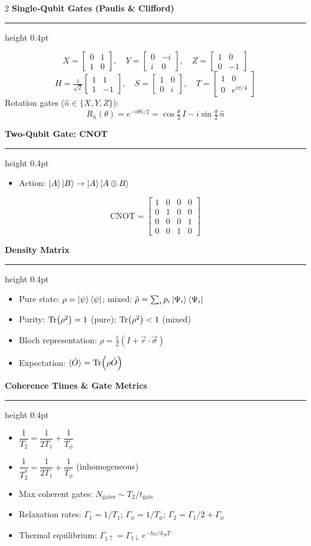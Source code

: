 \documentclass[10pt,a4paper]{article}
\newcommand{\subsec}[1]{%
  \vspace{3pt}%
  {\small\bfseries\color{subseccolor}#1}%
  \vspace{1pt}\hrule height 0.4pt \vspace{2pt}%
}
\begin{document}
\begin{multicols}{2}
\subsec{Single-Qubit Gates (Paulis \& Clifford)}
\[
X=\begin{bmatrix}0&1\\1&0\end{bmatrix},\quad
Y=\begin{bmatrix}0&-i\\i&0\end{bmatrix},\quad
Z=\begin{bmatrix}1&0\\0&-1\end{bmatrix}
\]
\[
H=\tfrac{1}{\sqrt{2}}\begin{bmatrix}1&1\\1&-1\end{bmatrix},\quad
S=\begin{bmatrix}1&0\\0&i\end{bmatrix},\quad
T=\begin{bmatrix}1&0\\0&e^{i\pi/4}\end{bmatrix}
\]
Rotation gates ($\hat{n}\in\{X,Y,Z\}$):
\[
R_{\hat{n}}(\theta)=e^{-i\theta\hat{n}/2}
=\cos\tfrac{\theta}{2}\,I - i\sin\tfrac{\theta}{2}\,\hat{n}
\]

\subsec{Two-Qubit Gate: CNOT}
\begin{itemize}
  \item Action: $\ket{A}\ket{B}\to\ket{A}\ket{A\oplus B}$
\end{itemize}
\[
\mathrm{CNOT}=\begin{bmatrix}1&0&0&0\\0&1&0&0\\0&0&0&1\\0&0&1&0\end{bmatrix}
\]

\subsec{Density Matrix}
\begin{itemize}
  \item Pure state: $\rho=\ket{\psi}\bra{\psi}$; \quad mixed: $\hat\rho=\sum_i p_i\ket{\Psi_i}\bra{\Psi_i}$
  \item Purity: $\Tr(\rho^2)=1$ (pure); $\Tr(\rho^2)<1$ (mixed)
  \item Bloch representation: $\rho=\tfrac{1}{2}(I+\vec{r}\cdot\vec{\sigma})$
  \item Expectation: $\langle\hat{O}\rangle=\Tr(\rho\hat{O})$
\end{itemize}

\subsec{Coherence Times \& Gate Metrics}
\begin{itemize}
  \item $\dfrac{1}{T_2}=\dfrac{1}{2T_1}+\dfrac{1}{T_\phi}$
  \item $\dfrac{1}{T_2^*}=\dfrac{1}{2T_1}+\dfrac{1}{T_\phi}$ (inhomogeneous)
  \item Max coherent gates: $N_\text{gates}\sim T_2/t_\text{gate}$
  \item Relaxation rates: $\Gamma_1=1/T_1$; $\Gamma_\phi=1/T_\phi$; $\Gamma_2=\Gamma_1/2+\Gamma_\phi$
  \item Thermal equilibrium: $\Gamma_{1\uparrow}=\Gamma_{1\downarrow}\,e^{-\hbar\omega/k_BT}$
\end{itemize}


\end{multicols}
\end{document}
